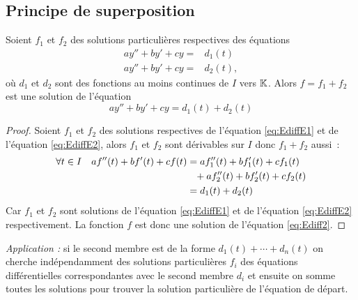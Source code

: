 \subsection{Principe de superposition}
\begin{prop}
  Soient $f_1$ et $f_2$ des solutions particulières respectives des équations
  \begin{align}
    ay''+by'+cy=&d_1(t) \label{eq:EdiffE1}\\ 
    ay''+by'+cy=&d_2(t) \label{eq:EdiffE2},
  \end{align}
où $d_1$ et $d_2$ sont des fonctions au moins continues de $I$ vers $\mathbb{K}$. Alors $f=f_1+f_2$ est une solution de l'équation
\begin{equation}
  ay''+by'+cy=d_1(t)+d_2(t)
\end{equation}
\end{prop}
\begin{proof}
  Soient $f_1$ et $f_2$ des solutions respectives de l'équation \eqref{eq:EdiffE1} et de l'équation \eqref{eq:EdiffE2}, alors $f_1$ et $f_2$ sont dérivables sur $I$ donc $f_1+f_2$ aussi~:
  \begin{align}
    \forall t \in I \quad af''(t)+bf'(t)+cf(t)&=af_1''(t)+bf_1'(t)+cf_1(t) \notag \\ %
    &\phantom{=}+af_2''(t)+bf_2'(t)+cf_2(t)\\ &=d_1(t)+d_2(t)
  \end{align}
Car $f_1$ et $f_2$ sont solutions de l'équation \eqref{eq:EdiffE1} et de l'équation \eqref{eq:EdiffE2} respectivement. La fonction $f$ est donc une solution de l'équation \eqref{eq:Ediff2}.
\end{proof}
\emph{Application :} si le second membre est de la forme $d_1(t)+ \dotsb +d_n(t)$ on cherche indépendamment des solutions particulières $f_i$ des équations différentielles correspondantes avec le second membre $d_i$ et ensuite on somme toutes les solutions pour trouver la solution particulière de l'équation de départ.

